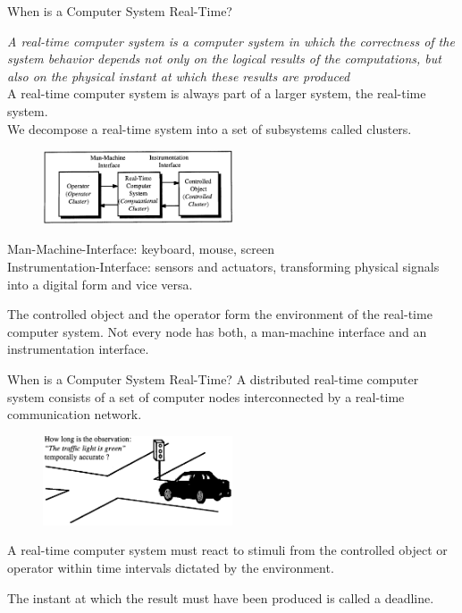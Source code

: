 \begin{frame}{When is a Computer System Real-Time?}

\textit{A real-time computer system is a computer system in which the
correctness of the system behavior depends not only on the logical
results of the computations, but also on the physical instant at which
these results are produced}\\
A real-time computer system is always part of a larger system, the
real-time system.\\
We decompose a real-time system into a set of subsystems called
clusters.\\


\begin{figure}
\includegraphics[width=0.5\textwidth]{media/Fig_1_1.png}
\centering\\
\end{figure}

Man-Machine-Interface: keyboard, mouse, screen\\
Instrumentation-Interface: sensors and actuators, transforming physical
signals into a digital form and vice versa.

The controlled object and the operator form the environment of the
real-time computer system. Not every node has both, a man-machine
interface and an instrumentation interface.

\end{frame}

\begin{frame}{When is a Computer System Real-Time?}
A distributed real-time computer system consists of a set of computer
nodes interconnected by a real-time communication network.

\begin{figure}
\includegraphics[width=0.5\textwidth]{media/Fig_1_2.png}
\centering
\end{figure}

A real-time computer system must react to stimuli from the controlled
object or operator within time intervals dictated by the environment.

The instant at which the result must have been produced is called a
deadline.
\end{frame}

